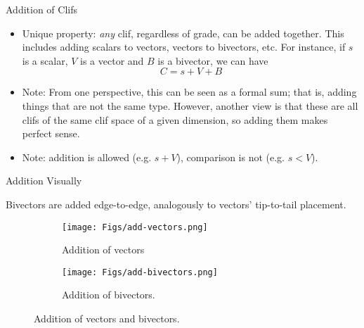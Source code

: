 \documentclass[aspectratio=169,xcolor=dvipsnames]{beamer}
\begin{document}
\begin{frame}{Addition of Clifs}
\begin{itemize}
\item Unique property: \textit{any} clif, regardless of grade, can be added together.
      This includes adding scalars to vectors, vectors to bivectors, etc. For instance,
      if $s$ is a scalar, $V$ is a vector and $B$ is a bivector, we can have
      $$C = s + V + B$$
\item Note: From one perspective, this can be seen as a formal sum; that is, adding things
      that are not the same type. However, another view is that these are all clifs of the
      same clif space of a given dimension, so adding them makes perfect sense.
\item Note: addition is allowed (e.g. $s + V$), comparison is not (e.g. $s < V$).
\end{itemize}

\end{frame}
      



\begin{frame}{Addition Visually}

Bivectors are added edge-to-edge, analogously to vectors' tip-to-tail placement.


\begin{figure}[h]
      \centering
      \begin{subfigure}{0.4\textwidth}
            \centering
            \texttt{[image: Figs/add-vectors.png]}
            \caption{Addition of vectors}
            \label{fig:first}
      \end{subfigure}
      \begin{subfigure}{0.4\textwidth}
            \centering
            \texttt{[image: Figs/add-bivectors.png]}
            \caption{Addition of bivectors.}
            \label{fig:first}
      \end{subfigure}
      \caption{Addition of vectors and bivectors.}
      \label{fig:main}
  \end{figure}
\end{frame}
      
\end{document}
